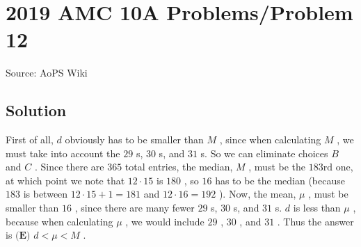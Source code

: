 \documentclass[12pt]{article}
\begin{document}
\section*{{2019 AMC 10A Problems/Problem 12}}
Source: AoPS Wiki

\subsection*{Solution}
First of all, $d$ obviously has to be smaller than $M$ , since when calculating $M$ , we must take into account the $29$ s, $30$ s, and $31$ s. So we can eliminate choices $B$ and $C$ . Since there are $365$ total entries, the median, $M$ , must be the $183\text{rd}$ one, at which point we note that $12 \cdot 15$ is $180$ , so $16$ has to be the median (because $183$ is between $12 \cdot 15 + 1 = 181$ and $12 \cdot 16 = 192$ ). Now, the mean, $\mu$ , must be smaller than $16$ , since there are many fewer $29$ s, $30$ s, and $31$ s. $d$ is less than $\mu$ , because when calculating $\mu$ , we would include $29$ , $30$ , and $31$ . Thus the answer is $\boxed{\textbf{(E) } d < \mu < M}$ .
\end{document}
